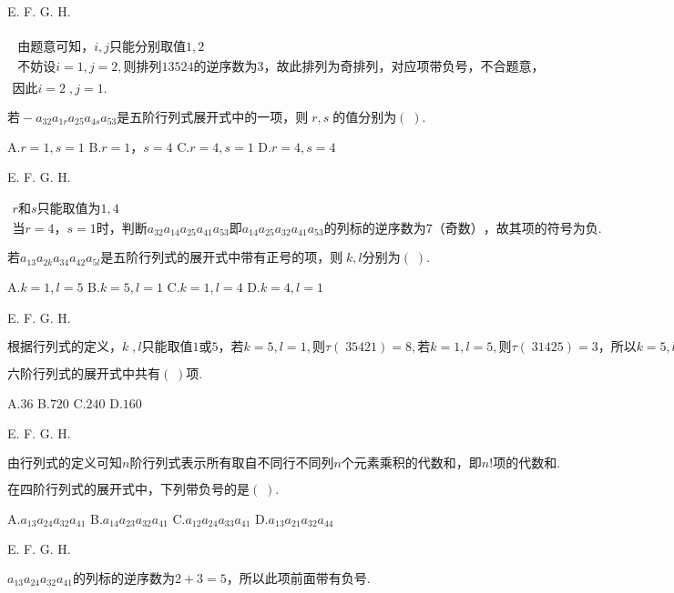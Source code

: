 E.   F.   G.   H.

$\begin{array}{l}\begin{array}{l}\mathrm{由题意可知}，i,j\mathrm{只能分别取值}1,2\\\mathrm{不妨设}i=1,j=2,\mathrm{则排列}13524\mathrm{的逆序数为}3，\mathrm{故此排列为奇排列}，\mathrm{对应项带负号}，\mathrm{不合题意}，\end{array}\\\mathrm{因此}i=2\;,j=1.\end{array}$


$若-a_{32}a_{1r}a_{25}a_{4s}a_{53}\mathrm{是五阶行列式展开式中的一项}，则\;r,s\;\mathrm{的值分别为}(\;).$

A.$r=1,s=1$   B.$r=1，s=4$   C.$r=4,s=1$   D.$r=4,s=4$

E.   F.   G.   H.

$\begin{array}{l}r和s\mathrm{只能取值为}1,4\\当r=4，s=1时，\mathrm{判断}a_{32}a_{14}a_{25}a_{41}a_{53}即a_{14}a_{25}a_{32}a_{41}a_{53}\mathrm{的列标的逆序数为}7（\mathrm{奇数}），\mathrm{故其项的符号为负}.\end{array}$


$若a_{13}a_{2k}a_{34}a_{42}a_{5l}\mathrm{是五阶行列式的展开式中带有正号的项}，则\;k,l\mathrm{分别为}(\;).$

A.$k=1,l=5$   B.$k=5,l=1$   C.$k=1,l=4$   D.$k=4,l=1$

E.   F.   G.   H.

$\mathrm{根据行列式的定义}，k\;,l\mathrm{只能取值}1或5，若k=5,l=1,则\tau(\;35421)=8,若k=1,l=5,则\tau(\;31425)=3，\mathrm{所以}k=5,l=1.$


$\mathrm{六阶行列式的展开式中共有}(\;)项.$

A.$36$   B.$720$   C.$240$   D.$160$

E.   F.   G.   H.

$\mathrm{由行列式的定义可知}n\mathrm{阶行列式表示所有取自不同行不同列}n\mathrm{个元素乘积的代数和}，即n!\mathrm{项的代数和}.$


$\mathrm{在四阶行列式的展开式中}，\mathrm{下列带负号的是}(\;).$

A.$a_{13}a_{24}a_{32}a_{41}$   B.$a_{14}a_{23}a_{32}a_{41}$   C.$a_{12}a_{24}a_{33}a_{41}$   D.$a_{13}a_{21}a_{32}a_{44}$

E.   F.   G.   H.

$a_{13}a_{24}a_{32}a_{41}\mathrm{的列标的逆序数为}2+3=5，\mathrm{所以此项前面带有负号}.$


